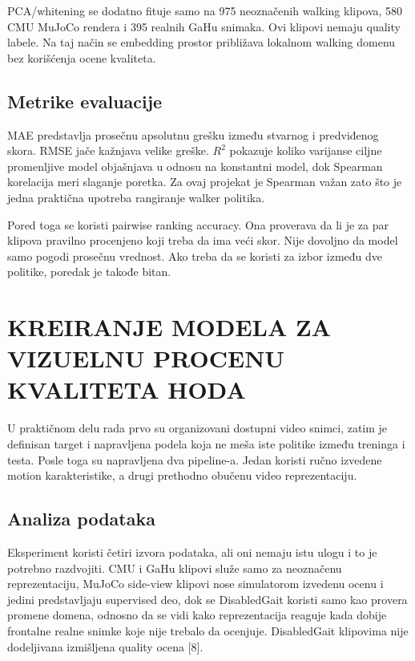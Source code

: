 \documentclass[12pt,a4paper]{report}
\begin{document}
PCA/whitening se dodatno fituje samo na 975 neoznačenih walking klipova, 580 CMU
MuJoCo rendera i 395 realnih GaHu snimaka. Ovi klipovi nemaju quality labele.
Na taj način se embedding prostor približava lokalnom walking domenu bez
korišćenja ocene kvaliteta.

\section{Metrike evaluacije}

MAE predstavlja prosečnu apsolutnu grešku između stvarnog i predviđenog skora.
RMSE jače kažnjava velike greške. $R^2$ pokazuje koliko varijanse ciljne
promenljive model objašnjava u odnosu na konstantni model, dok Spearman
korelacija meri slaganje poretka. Za ovaj projekat je Spearman važan zato što je
jedna praktična upotreba rangiranje walker politika.

Pored toga se koristi pairwise ranking accuracy. Ona proverava da li je za par
klipova pravilno procenjeno koji treba da ima veći skor. Nije dovoljno da model
samo pogodi prosečnu vrednost. Ako treba da se koristi za izbor između dve
politike, poredak je takođe bitan.

\chapter{KREIRANJE MODELA ZA VIZUELNU PROCENU KVALITETA HODA}

U praktičnom delu rada prvo su organizovani dostupni video snimci, zatim je
definisan target i napravljena podela koja ne meša iste politike između treninga
i testa. Posle toga su napravljena dva pipeline-a. Jedan koristi ručno izvedene
motion karakteristike, a drugi prethodno obučenu video reprezentaciju.

\section{Analiza podataka}

Eksperiment koristi četiri izvora podataka, ali oni nemaju istu ulogu i to je
potrebno razdvojiti. CMU i GaHu klipovi služe samo za neoznačenu reprezentaciju,
MuJoCo side-view klipovi nose simulatorom izvedenu ocenu i jedini predstavljaju
supervised deo, dok se DisabledGait koristi samo kao provera promene domena,
odnosno da se vidi kako reprezentacija reaguje kada dobije frontalne realne
snimke koje nije trebalo da ocenjuje. DisabledGait klipovima nije dodeljivana
izmišljena quality ocena [8].
\end{document}
